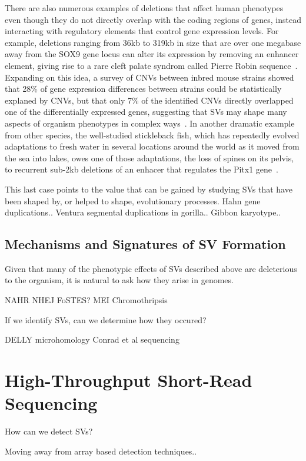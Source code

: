 There are also numerous examples of deletions that affect human phenotypes even though they do not directly overlap with the coding regions of genes, instead interacting with regulatory elements that control gene expression levels. For example, deletions ranging from 36kb to 319kb in size that are over one megabase away from the SOX9 gene locus can alter its expression by removing an enhancer element, giving rise to a rare cleft palate syndrom called Pierre Robin sequence~\cite{Benko:2009dq}. Expanding on this idea, a survey of CNVs between inbred mouse strains showed that 28\% of gene expression differences between strains could be statistically explaned by CNVs, but that only 7\% of the identified CNVs directly overlapped one of the differentially expressed genes, suggesting that SVs may shape many aspects of organism phenotypes in complex ways~\cite{Cahan:2009ef}. In another dramatic example from other species, the well-studied stickleback fish, which has repeatedly evolved adaptations to fresh water in several locations around the world as it moved from the sea into lakes, owes one of those adaptations, the loss of spines on its pelvis, to recurrent sub-2kb deletions of an enhacer that regulates the Pitx1 gene~\cite{Chan:2010hz}.

This last case points to the value that can be gained by studying SVs that have been shaped by, or helped to shape, evolutionary processes. Hahn gene duplications.. Ventura segmental duplications in gorilla.. Gibbon karyotype.. 

\subsection{Mechanisms and Signatures of SV Formation}

Given that many of the phenotypic effects of SVs described above are deleterious to the organism, it is natural to ask how they arise in genomes. 

NAHR
NHEJ
FoSTES?
MEI
Chromothripsis

If we identify SVs, can we determine how they occured?

DELLY microhomology
Conrad et al sequencing

\section{High-Throughput Short-Read Sequencing}

How can we detect SVs?

Moving away from array based detection techniques..

